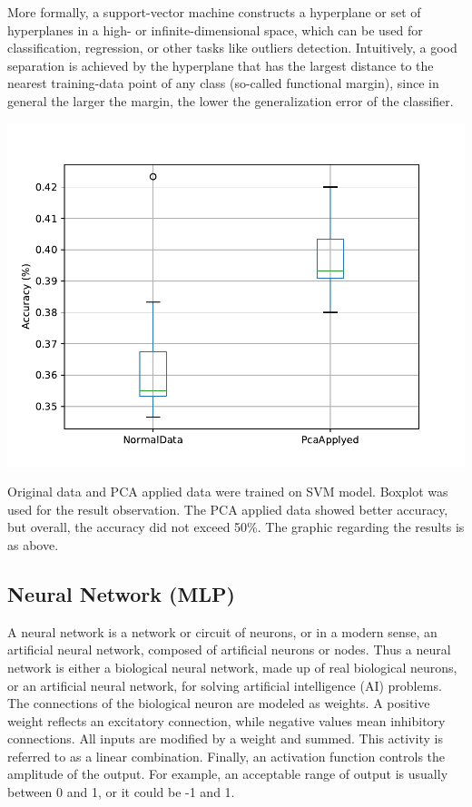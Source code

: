 \documentclass{article}
\begin{document}
More formally, a support-vector machine constructs a hyperplane or set of hyperplanes in a high- or infinite-dimensional space, which can be used for classification, regression, or other tasks like outliers detection. Intuitively, a good separation is achieved by the hyperplane that has the largest distance to the nearest training-data point of any class (so-called functional margin), since in general the larger the margin, the lower the generalization error of the classifier. 

\begin{center}
    \vspace{1em}
        \includegraphics[scale=0.75]{graphs/SVM.pdf}
    \vspace{1em}
\end{center}

Original data and PCA applied data were trained on SVM model. Boxplot was used for the result observation. The PCA applied data showed better accuracy, but overall, the accuracy did not exceed 50\%. The graphic regarding the results is as above.


\subsection{ Neural Network (MLP)}

A neural network is a network or circuit of neurons, or in a modern sense, an artificial neural network, composed of artificial neurons or nodes. Thus a neural network is either a biological neural network, made up of real biological neurons, or an artificial neural network, for solving artificial intelligence (AI) problems. The connections of the biological neuron are modeled as weights. A positive weight reflects an excitatory connection, while negative values mean inhibitory connections. All inputs are modified by a weight and summed. This activity is referred to as a linear combination. Finally, an activation function controls the amplitude of the output. For example, an acceptable range of output is usually between 0 and 1, or it could be -1 and 1.
\end{document}
